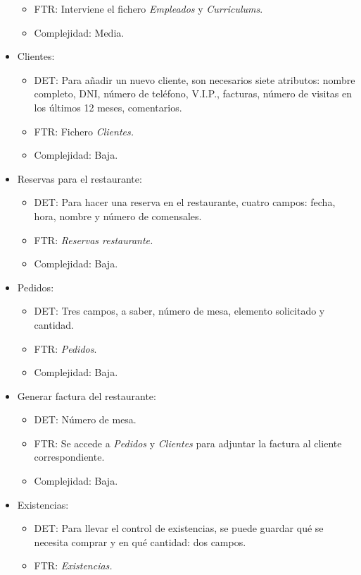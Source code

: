\documentclass[spanish,a4paper,12pt]{report}	%
\begin{document}
\begin{itemize}
\begin{itemize}
			\item{FTR:} Interviene el fichero \textit{Empleados} y \textit{Curriculums}.
			\item{Complejidad:} Media.
		\end{itemize}
		\item{Clientes:} 
		\begin{itemize}
 			\item{DET:} Para añadir un nuevo cliente, son necesarios siete atributos: nombre completo, DNI, número de teléfono, V.I.P., facturas, número de visitas en los últimos 12 meses, comentarios.
			\item{FTR:} Fichero \textit{Clientes.}
			\item{Complejidad:} Baja.
		\end{itemize}
		\item{Reservas para el restaurante:} 
		\begin{itemize}
 			\item{DET:} Para hacer una reserva en el restaurante, cuatro campos: fecha, hora, nombre y número de comensales.
			\item{FTR:} \textit{Reservas restaurante.}
			\item{Complejidad:} Baja.
		\end{itemize}
		\item{Pedidos:} 
		\begin{itemize}
 			\item{DET:} Tres campos, a saber, número de mesa, elemento solicitado y cantidad.
			\item{FTR:} \textit{Pedidos}.
			\item{Complejidad:} Baja.
		\end{itemize}
		\item{Generar factura del restaurante:} 
		\begin{itemize}
 			\item{DET:} Número de mesa.
			\item{FTR:} Se accede a \textit{Pedidos} y \textit{Clientes} para adjuntar la factura al cliente correspondiente.
			\item{Complejidad:} Baja.
		\end{itemize}
		\item{Existencias:} 
		\begin{itemize}
 			\item{DET:} Para llevar el control de existencias, se puede guardar qué se necesita comprar y en qué cantidad: dos campos.
			\item{FTR:} \textit{Existencias.}

\end{itemize}
\end{itemize}
\end{document}
